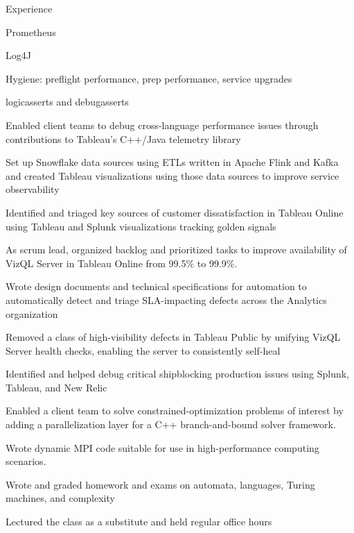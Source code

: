 \documentclass{cv}
\begin{document}

\begin{cvsection}{Experience}
  {
    \item Prometheus
    \item Log4J
    \item Hygiene: preflight performance, prep performance, service upgrades
    \item logicasserts and debugasserts
    \item Enabled client teams to debug cross-language performance issues through contributions to Tableau's C++/Java telemetry library
    \item Set up Snowflake data sources using ETLs written in Apache Flink and Kafka and created Tableau visualizations using those data sources to improve service observability
    \item Identified and triaged key sources of customer dissatisfaction in Tableau Online using Tableau and Splunk visualizations tracking golden signals
    \item As scrum lead, organized backlog and prioritized tasks to improve availability of VizQL Server in Tableau Online from 99.5\% to 99.9\%.
    \item Wrote design documents and technical specifications for automation to automatically detect and triage SLA-impacting defects across the Analytics organization
    \item Removed a class of high-visibility defects in Tableau Public by unifying VizQL Server health checks, enabling the server to consistently self-heal
    \item Identified and helped debug critical shipblocking production issues using Splunk, Tableau, and New Relic
  }
  {
    \item Enabled a client team to solve constrained-optimization problems of interest by adding a parallelization layer for a C++ branch-and-bound solver framework.
    \item Wrote dynamic MPI code suitable for use in high-performance computing scenarios.
  }
  {
    \item Wrote and graded homework and exams on automata, languages, Turing machines, and complexity
    \item Lectured the class as a substitute and held regular office hours
  }
\end{cvsection}
\end{document}
